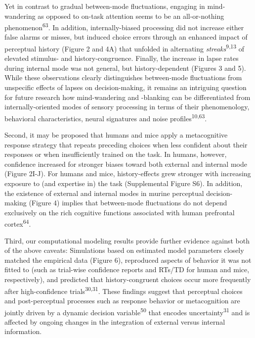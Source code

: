 \documentclass[
]{article}
\begin{document}
Yet in contrast to gradual between-mode fluctuations, engaging in
mind-wandering as opposed to on-task attention seems to be an
all-or-nothing phenomenon\textsuperscript{63}. In addition,
internally-biased processing did not increase either false alarms or
misses, but induced choice errors through an enhanced impact of
perceptual history (Figure 2 and 4A) that unfolded in alternating
\emph{streaks}\textsuperscript{9,13} of elevated stimulus- and
history-congruence. Finally, the increase in lapse rates during internal
mode was not general, but history-dependent (Figures 3 and 5). While
these observations clearly distinguishes between-mode fluctuations from
unspecific effects of lapses on decision-making, it remains an
intriguing question for future research how mind-wandering and -blanking
can be differentiated from internally-oriented modes of sensory
processing in terms of their phenomenology, behavioral characteristics,
neural signatures and noise profiles\textsuperscript{10,63}.

Second, it may be proposed that humans and mice apply a metacognitive
response strategy that repeats preceding choices when less confident
about their responses or when insufficiently trained on the task. In
humans, however, confidence increased for stronger biases toward both
external and internal mode (Figure 2I-J). For humans and mice,
history-effects grew stronger with increasing exposure to (and expertise
in) the task (Supplemental Figure S6). In addition, the existence of
external and internal modes in murine perceptual decision-making (Figure
4) implies that between-mode fluctuations do not depend exclusively on
the rich cognitive functions associated with human prefrontal
cortex\textsuperscript{64}.

Third, our computational modeling results provide further evidence
against both of the above caveats: Simulations based on estimated model
parameters closely matched the empirical data (Figure 6), reproduced
aspects of behavior it was not fitted to (such as trial-wise confidence
reports and RTs/TD for human and mice, respectively), and predicted that
history-congruent choices occur more frequently after high-confidence
trials\textsuperscript{30,31}. These findings suggest that perceptual
choices and post-perceptual processes such as response behavior or
metacognition are jointly driven by a dynamic decision
variable\textsuperscript{50} that encodes
uncertainty\textsuperscript{31} and is affected by ongoing changes in
the integration of external versus internal information.
\end{document}
